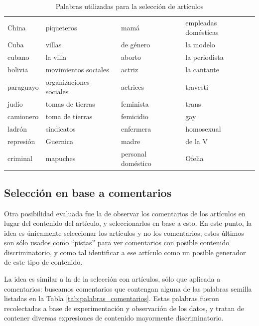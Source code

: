 \begin{table}[]
    \centering
    \begin{tabular}{l | l | l | l}
    China        &  piqueteros              &  mamá                & empleadas domésticas  \\
    Cuba         &  villas                  &  de género           & la modelo             \\
    cubano       &  la villa                &  aborto              & la periodista         \\
    bolivia      &  movimientos sociales    &  actriz              & la cantante           \\
    paraguayo    &  organizaciones sociales &  actrices            & travesti              \\
    judío        &  tomas de tierras        &  feminista           & trans                 \\
    camionero    &  toma de tierras         &  femicidio           & gay                   \\
    ladrón       &  sindicatos              &  enfermera           & homosexual            \\
    represión    &  Guernica                &  madre               & de la V               \\
    criminal     &  mapuches                &  personal doméstico  & Ofelia                \\
    \end{tabular}
    \caption{Palabras utilizadas para la selección de artículos}
    \label{tab:palabras_articulos}
\end{table}

\subsection{Selección en base a comentarios}

Otra posibilidad evaluada fue la de observar los comentarios de los artículos en lugar del contenido del artículo, y seleccionarlos en base a esto. En este punto, la idea es únicamente seleccionar los artículos y no los comentarios; estos últimos son sólo usados como ``pistas'' para ver comentarios con posible contenido discriminatorio, y como tal identificar a ese artículo como un posible generador de este tipo de contenido.

La idea es similar a la de la selección con artículos, sólo que aplicada a comentarios: buscamos comentarios que contengan alguna de las palabras semilla listadas en la Tabla \ref{tab:palabras_comentarios}. Estas palabras fueron recolectadas a base de experimentación y observación de los datos, y tratan de contener diversas expresiones de contenido mayormente discriminatorio.

